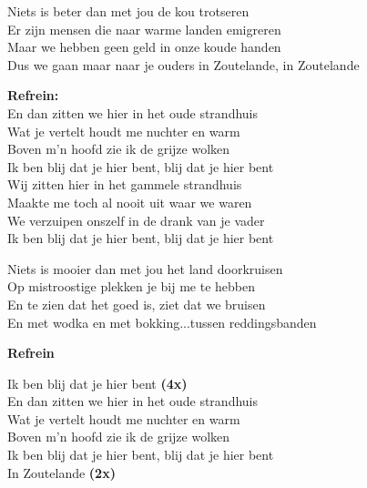 Niets is beter dan met jou de kou trotseren\\
Er zijn mensen die naar warme landen emigreren\\
Maar we hebben geen geld in onze koude handen\\
Dus we gaan maar naar je ouders in Zoutelande, in Zoutelande

\textbf{Refrein:}\\
En dan zitten we hier in het oude strandhuis\\
Wat je vertelt houdt me nuchter en warm\\
Boven m’n hoofd zie ik de grijze wolken\\
Ik ben blij dat je hier bent, blij dat je hier bent\\
Wij zitten hier in het gammele strandhuis\\
Maakte me toch al nooit uit waar we waren\\
We verzuipen onszelf in de drank van je vader\\
Ik ben blij dat je hier bent, blij dat je hier bent

Niets is mooier dan met jou het land doorkruisen\\
Op mistroostige plekken je bij me te hebben\\
En te zien dat het goed is, ziet dat we bruisen\\
En met wodka en met bokking...tussen reddingsbanden

\textbf{Refrein}

Ik ben blij dat je hier bent \textbf{(4x)}\\
En dan zitten we hier in het oude strandhuis\\
Wat je vertelt houdt me nuchter en warm\\
Boven m’n hoofd zie ik de grijze wolken\\
Ik ben blij dat je hier bent, blij dat je hier bent\\
In Zoutelande \textbf{(2x)}
